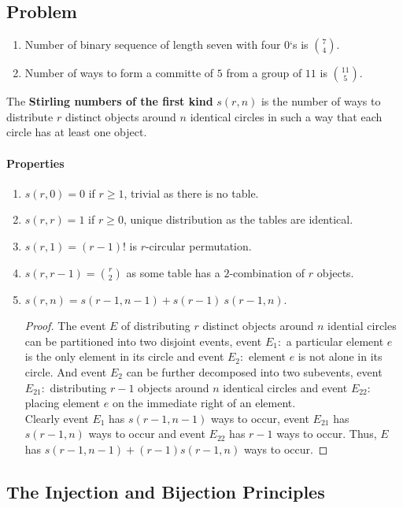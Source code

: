 \subsection*{Problem}
\begin{enumerate}
	\item Number of binary sequence of length seven with four $0$`s is $\binom{7}{4}$.
	\item Number of ways to form a committe of $5$ from a group of $11$ is $\binom{11}{5}$.
\end{enumerate}
\begin{definition}
	The \textbf{Stirling numbers of the first kind} $s(r,n)$ is the number of ways to distribute $r$ distinct objects around $n$ identical circles in such a way that each circle has at least one object.
\end{definition}
\paragraph{Properties}
\begin{enumerate}
	\item $s(r,0) = 0$ if $r \ge 1$, trivial as there is no table.
	\item $s(r,r) = 1$ if $r \ge 0$, unique distribution as the tables are identical.
	\item $s(r,1) = (r-1)!$ is $r$-circular permutation.
	\item $s(r,r-1) = \binom{r}{2}$ as some table has a $2$-combination of $r$ objects.
	\item $s(r,n) = s(r-1,n-1)+s(r-1)\ s(r-1,n)$.
	\begin{proof}
		The event $E$ of distributing $r$ distinct objects around $n$ idential circles can be partitioned into two disjoint events, event $E_1 :$ a particular element $e$ is the only element in its circle and event $E_2 :$ element $e$ is not alone in its circle. And event $E_2$ can be further decomposed into two subevents, event $E_{21} :$ distributing $r-1$ objects around $n$ identical circles and event $E_{22} :$ placing element $e$ on the immediate right of an element.\\

		Clearly event $E_1$ has $s(r-1,n-1)$ ways to occur, event $E_{21}$ has $s(r-1,n)$ ways to occur and event $E_{22}$ has $r-1$ ways to occur. Thus, $E$ has $s(r-1,n-1) + (r-1) s(r-1,n)$ ways to occur.
	\end{proof}
\end{enumerate}
\subsection{The Injection and Bijection Principles}
